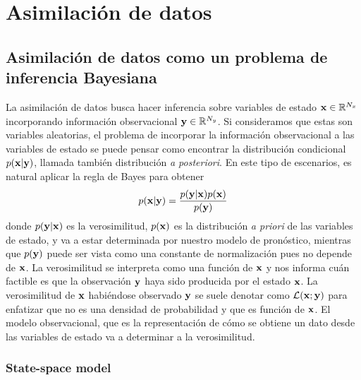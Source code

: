 \chapter{Asimilación de datos} \label{chp:da}

\section{Asimilación de datos como un problema de inferencia Bayesiana}

La asimilación de datos busca hacer inferencia sobre variables de estado $\mathbf{x} \in \mathbb R^{N_x}$ incorporando información observacional $\mathbf{y} \in \mathbb R^{N_y}$. Si consideramos que estas son variables aleatorias, el problema de incorporar la información observacional a las variables de estado se puede pensar como encontrar la distribución condicional $p(\mathbf{x} | \mathbf{y})$, llamada también distribución \textit{a posteriori}. En este tipo de escenarios, es natural aplicar la regla de Bayes para obtener
\begin{align*}
    p(\mathbf{x} | \mathbf{y}) = \frac{p(\mathbf{y} | \mathbf{x})p(\mathbf{x})}{p(\mathbf{y})}
\end{align*}
donde $p(\mathbf{y} | \mathbf{x})$ es la verosimilitud, $p(\mathbf{x})$ es la distribución \textit{a priori} de las variables de estado, y va a estar determinada por nuestro modelo de pronóstico, mientras que $p(\mathbf{y})$ puede ser vista como una constante de normalización pues no depende de $\mathbf{x}$. La verosimilitud se interpreta como una función de $\mathbf{x}$ y nos informa cuán factible es que la observación $\mathbf{y}$ haya sido producida por el estado $\mathbf{x}$. La verosimilitud de $\mathbf{x}$ habiéndose observado $\mathbf{y}$ se suele denotar como $\mathcal{L}(\mathbf{x} ; \mathbf{y})$ para enfatizar que no es una densidad de probabilidad y que es función de $\mathbf{x}$. El modelo observacional, que es la representación de cómo se obtiene un dato desde las variables de estado va a determinar a la verosimilitud.

\subsection{State-space model}

